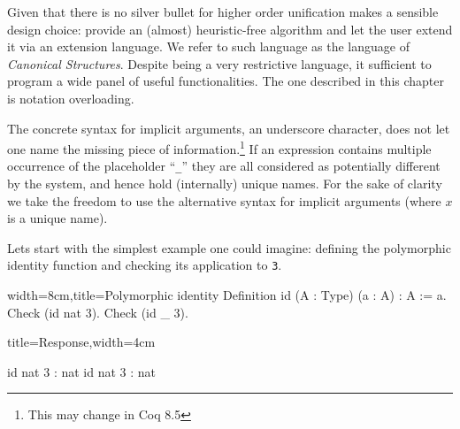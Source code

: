 Given that there is no silver bullet for higher order unification
\Coq{} makes a sensible design choice: provide an (almost)
heuristic-free algorithm and let the user extend it via an extension
language.  We refer to such language as the language of
\emph{Canonical Structures}.  Despite being a very restrictive language,
it sufficient to program a wide panel of useful functionalities.  The
one described in this chapter is notation overloading.

The concrete syntax for implicit arguments, an underscore character,
does not let one name the missing piece of information.\footnote{This
may change in Coq 8.5}  If an expression contains multiple occurrence
of the placeholder ``\lstinline/_/'' they are all considered as
potentially different by the system, and hence hold (internally)
unique names.  For the sake of clarity we take the freedom to
use the alternative syntax  for implicit arguments (where
$x$ is a unique name).


Lets start with the simplest example one could imagine: defining the
polymorphic identity function and checking its application to
\lstinline/3/.

\begin{coq}{width=8cm,title=Polymorphic identity}
Definition id (A : Type) (a : A) : A := a.
Check (id nat 3).
Check (id _ 3).
\end{coq}
\begin{coqout}{title=Response,width=4cm}

id nat 3 : nat 
id nat 3 : nat
\end{coqout}

